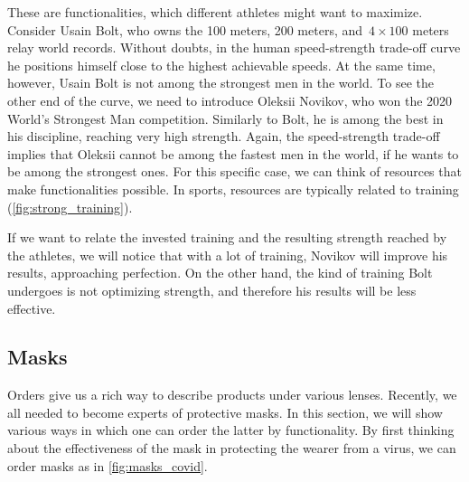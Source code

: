 \begin{marginfigure}
    \centering
    \caption{}
    \label{fig:fast_strong}
\end{marginfigure}

These are functionalities, which different athletes might want to maximize.
Consider Usain Bolt, who owns the 100 meters, 200 meters, and~$4\times 100$ meters relay world records.
Without doubts, in the human speed-strength trade-off curve he positions himself close to the highest achievable speeds.
At the same time, however, Usain Bolt is not among the strongest men in the world.
To see the other end of the curve, we need to introduce Oleksii Novikov, who won the 2020 World's Strongest Man competition.
Similarly to Bolt, he is among the best in his discipline, reaching very high strength.
Again, the speed-strength trade-off implies that Oleksii cannot be among the fastest men in the world, if he wants to be among the strongest ones.
For this specific case, we can think of resources that make functionalities possible.
In sports, resources are typically related to training (\cref{fig:strong_training}).

\begin{marginfigure}
    \centering
    \caption{}
    \label{fig:strong_training}
\end{marginfigure}

If we want to relate the invested training and the resulting strength reached by the athletes, we will notice that with a lot of training, Novikov will improve his results, approaching perfection.
On the other hand, the kind of training Bolt undergoes is not optimizing strength, and therefore his results will be less effective.


\subsection{Masks}

Orders give us a rich way to describe products under various lenses.
Recently, we all needed to become experts of protective masks.
In this section, we will show various ways in which one can order the latter by functionality.
By first thinking about the effectiveness of the mask in protecting the wearer from a virus, we can order masks as in \cref{fig:masks_covid}.

